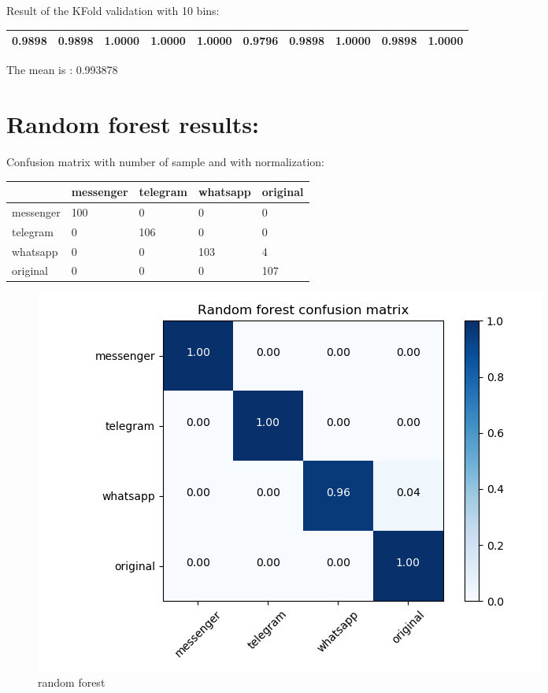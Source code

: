 Result of the KFold validation with 10 bins:
 {\def\arraystretch{1.3} 
 \begin{table}[H] 
\centering 
\begin{tabular}{|l |l |l |l |l |l |l |l |l |l |}  
\hline 
0.9898&
0.9898&
1.0000&
1.0000&
1.0000&
0.9796&
0.9898&
1.0000&
0.9898&
1.0000\\ \hline  

\end{tabular} 
\end{table} }

The mean is : 0.993878\section{Random forest results:}Confusion matrix with number of sample and with normalization:
 {\def\arraystretch{1.3} 
 \begin{table}[H] 
\centering 
\begin{tabular}{|l|l|l|l|l|} 
\hline 
  &messenger  &telegram  &whatsapp  &original  \\ \hline
messenger  &100  &0  &0  &0  \\ \hline
telegram  &0  &106  &0  &0  \\ \hline
whatsapp  &0  &0  &103  &4  \\ \hline
original  &0  &0  &0  &107  \\ \hline
\end{tabular} 
\end{table} }

 \begin{figure}[H] 
\centering 
\includegraphics[scale=.6]{images/new_met_rf_initial.png} 
\caption{random forest} 
\end{figure} 


